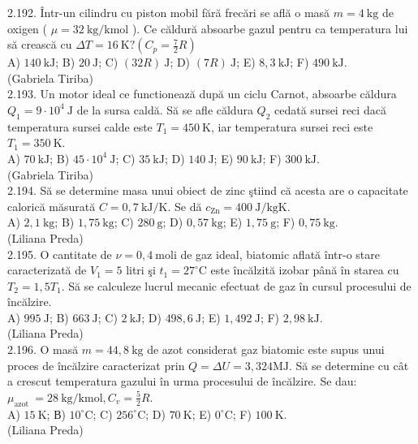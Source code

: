 2.192. Într-un cilindru cu piston mobil fără frecări se află o masă $m=4 \mathrm{~kg}$ de oxigen ( $\mu=32 \mathrm{~kg} / \mathrm{kmol}$ ). Ce căldură absoarbe gazul pentru ca temperatura lui să crească cu $\Delta T=16 \mathrm{~K} ?\left(C_{p}=\frac{7}{2} R\right)$\\ A) $140 \mathrm{~kJ}$; B) $20 \mathrm{~J}$; C) $(32 R) \mathrm{~J}$; D) $(7 R) \mathrm{~J}$; E) $8,3 \mathrm{~kJ}$; F) $490 \mathrm{~kJ}$.\\ (Gabriela Tiriba)\\

2.193. Un motor ideal ce functionează după un ciclu Carnot, absoarbe căldura $Q_{1}=9 \cdot 10^{4} \mathrm{~J}$ de la sursa caldă. Să se afle căldura $Q_{2}$ cedată sursei reci dacă temperatura sursei calde este $T_{1}=450 \mathrm{~K}$, iar temperatura sursei reci este $T_{1}=350 \mathrm{~K}$.\\ A) $70 \mathrm{~kJ}$; B) $45 \cdot 10^{4} \mathrm{~J}$; C) $35 \mathrm{~kJ}$; D) $140 \mathrm{~J}$; E) $90 \mathrm{~kJ}$; F) $300 \mathrm{~kJ}$.\\ (Gabriela Tiriba)\\

2.194. Să se determine masa unui obiect de zinc ştiind că acesta are o capacitate calorică măsurată $C=0,7 \mathrm{~kJ} / \mathrm{K}$. Se dă $c_{\mathrm{Zn}}=400 \mathrm{~J} / \mathrm{kgK}$.\\ A) $2,1 \mathrm{~kg}$; B) $1,75 \mathrm{~kg}$; C) $280 \mathrm{~g}$; D) $0,57 \mathrm{~kg}$; E) $1,75 \mathrm{~g}$; F) $0,75 \mathrm{~kg}$.\\ (Liliana Preda)\\

2.195. O cantitate de $\nu=0,4 \mathrm{~moli}$ de gaz ideal, biatomic aflată într-o stare caracterizată de $V_{1}=5$ litri şi $t_{1}=27^{\circ} \mathrm{C}$ este încălzită izobar până în starea cu $T_{2}=1,5 T_{1}$. Să se calculeze lucrul mecanic efectuat de gaz în cursul procesului de încălzire.\\ A) $995 \mathrm{~J}$; B) $663 \mathrm{~J}$; C) $2 \mathrm{~kJ}$; D) $498,6 \mathrm{~J}$; E) $1,492 \mathrm{~J}$; F) $2,98 \mathrm{~kJ}$.\\ (Liliana Preda)\\

2.196. O masă $m=44,8 \mathrm{~kg}$ de azot considerat gaz biatomic este supus unui proces de încălzire caracterizat prin $Q=\Delta U=3,324 \mathrm{MJ}$. Să se determine cu cât a crescut temperatura gazului în urma procesului de încălzire. Se dau: $\mu_{\text {azot }}=28 \mathrm{~kg} / \mathrm{kmol}, C_{v}=\frac{5}{2} R$.\\ A) $15 \mathrm{~K}$; В) $10^{\circ} \mathrm{C}$; C) $256^{\circ} \mathrm{C}$; D) $70 \mathrm{~K}$; E) $0^{\circ} \mathrm{C}$; F) $100 \mathrm{~K}$.\\ (Liliana Preda)\\

